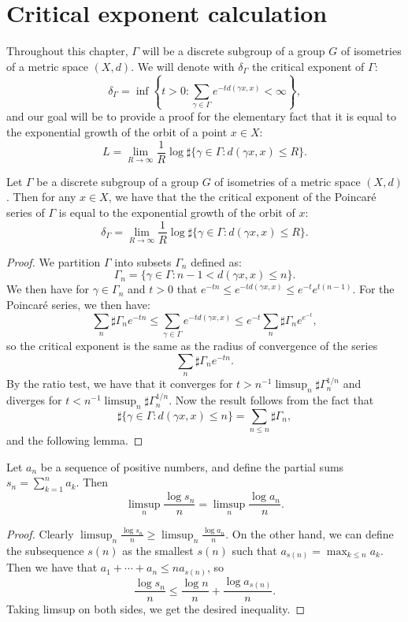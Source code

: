 \documentclass{report}
\begin{document}
\chapter{Critical exponent calculation}
Throughout this chapter, $\Gamma$ will be a discrete subgroup of a group $G$ of isometries of a metric space $(X, d)$.
We will denote with $\delta_\Gamma$ the critical exponent of $\Gamma$:
\[
\delta_\Gamma = \inf \left\{ t > 0 : \sum_{\gamma \in \Gamma} e^{-t d(\gamma x, x)} < \infty \right\},
\]
and our goal will be to provide a proof for the elementary fact that it is equal to the exponential growth of the orbit of a point $x \in X$:
\[
L = \lim_{R \to \infty} \frac{1}{R} \log \sharp \{ \gamma \in \Gamma : d(\gamma x, x) \leq R \}.
\]

\begin{proposition}
    Let $\Gamma$ be a discrete subgroup of a group $G$ of isometries of a metric space $(X, d)$.
    Then for any $x \in X$, we have that the the critical exponent of the Poincaré series of $\Gamma$ is equal to the exponential growth of the orbit of $x$:
    \[
    \delta_\Gamma = \lim_{R \to \infty} \frac{1}{R} \log \sharp \{ \gamma \in \Gamma : d(\gamma x, x) \leq R \}.
    \]
\end{proposition}
\begin{proof}
    We partition $\Gamma$ into subsets $\Gamma_n$ defined as:
    \[
    \Gamma_n = \{ \gamma \in \Gamma : n - 1 < d(\gamma x, x) \leq n \}.
    \]
    We then have for $\gamma \in \Gamma_n$ and $t>0$ that $e^{-tn} \leq e^{-t d(\gamma x, x)} \leq e^{-t} e^{t(n-1)}$.
    For the Poincaré series, we then have:
    \[
    \sum_{n} \sharp \Gamma_n e^{-t n} \leq \sum_{\gamma \in \Gamma} e^{-t d(\gamma x, x)} \leq e^{-t}\sum_{n} \sharp \Gamma_n e^{e^{-t}},
    \]
    so the critical exponent is the same as the radius of convergence of the series
    \[
    \sum_{n} \sharp \Gamma_n e^{-t n}.
    \]
    By the ratio test, we have that it converges for $t > n^{-1} \limsup_n \sharp \Gamma_n^{1/n}$ and diverges for $t < n^{-1} \limsup_n \sharp \Gamma_n^{1/n}$.
    Now the result follows from the fact that
    \[
    \sharp \{ \gamma \in \Gamma : d(\gamma x, x) \leq n \} = \sum_{n \leq n} \sharp \Gamma_n,
    \]
    and the following lemma.
\end{proof}

\begin{lemma}
Let $a_n$ be a sequence of positive numbers, and define the partial sums $s_n = \sum_{k=1}^n a_k$.
Then
\[
\limsup_n \frac{\log s_n}{n} = \limsup_n \frac{\log a_n}{n}.
\] 
\end{lemma}
\begin{proof}
    Clearly $\limsup_n \frac{\log s_n}{n} \geq \limsup_n \frac{\log a_n}{n}$.
    On the other hand, we can define the subsequence $s(n)$ as the smallest $s(n)$ such that $a_{s(n)} = \max_{k \leq n} a_k$.
    Then we have that $a_1 + \cdots + a_n \leq n a_{s(n)}$, so
    \[
    \frac{\log s_n}{n} \leq \frac{\log n}{n} + \frac{\log a_{s(n)}}{n}.
    \]
    Taking limsup on both sides, we get the desired inequality.
\end{proof}


\printindex
\printbibliography
\end{document}
